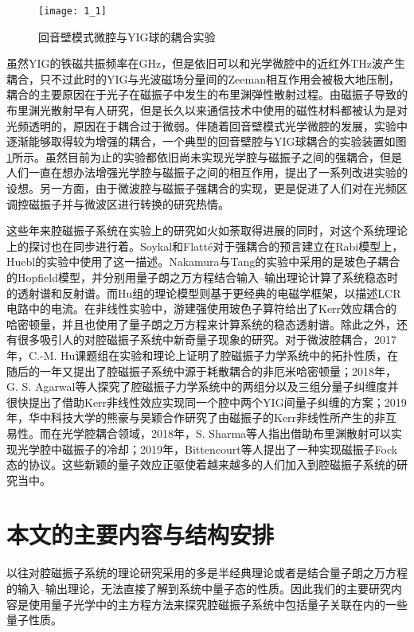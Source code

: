 \begin{figure}[htbp]
	\centering
	\texttt{[image: 1\_1]}
	\caption{回音壁模式微腔与YIG球的耦合实验\cite{PhysRevLett.116.223601Nakamura}} 
	\label{FigOpticalCavity}
\end{figure}
虽然YIG的铁磁共振频率在GHz，但是依旧可以和光学微腔中的近红外THz波产生耦合，只不过此时的YIG与光波磁场分量间的Zeeman相互作用会被极大地压制，耦合的主要原因在于光子在磁振子中发生的布里渊弹性散射过程。由磁振子导致的布里渊光散射早有人研究，但是长久以来通信技术中使用的磁性材料都被认为是对光频透明的，原因在于耦合过于微弱。伴随着回音壁模式光学微腔的发展，实验中逐渐能够取得较为增强的耦合，一个典型的回音壁腔与YIG球耦合的实验装置如图\ref{FigOpticalCavity}所示。虽然目前为止的实验都依旧尚未实现光学腔与磁振子之间的强耦合，但是人们一直在想办法增强光学腔与磁振子之间的相互作用，提出了一系列改进实验的设想\cite{Pantazopoulos_2018,PhysRevB.98.241406Graf,PhysRevResearch.3.013277Graf}。另一方面，由于微波腔与磁振子强耦合的实现，更是促进了人们对在光频区调控磁振子并与微波区进行转换的研究热情。

这些年来腔磁振子系统在实验上的研究如火如荼取得进展的同时，对这个系统理论上的探讨也在同步进行着。Soykal和Flatt\'e对于强耦合的预言建立在Rabi模型上，Huebl的实验中使用了这一描述。Nakamura与Tang的实验中采用的是玻色子耦合的Hopfield模型，并分别用量子朗之万方程结合输入--输出理论计算了系统稳态时的透射谱和反射谱。而Hu组的理论模型则基于更经典的电磁学框架，以描述LCR电路中的电流。在非线性实验中，游建强使用玻色子算符给出了Kerr效应耦合的哈密顿量，并且也使用了量子朗之万方程来计算系统的稳态透射谱。除此之外，还有很多吸引人的对腔磁振子系统中新奇量子现象的研究。对于微波腔耦合，2017年，C.-M. Hu课题组在实验和理论上证明了腔磁振子力学系统中的拓扑性质\cite{PhysRevB.95.214411Hu}，在随后的一年又提出了腔磁振子系统中源于耗散耦合的非厄米哈密顿量\cite{PhysRevLett.121.137203Hu}；2018年，G. S. Agarwal等人探究了腔磁振子力学系统中的两组分以及三组分量子纠缠度并很快提出了借助Kerr非线性效应实现同一个腔中两个YIG间量子纠缠的方案\cite{PhysRevLett.121.203601Agarwal}；2019年，华中科技大学的熊豪与吴颖合作研究了由磁振子的Kerr非线性所产生的非互易性\cite{PhysRevApplied.12.034001Xiong}。而在光学腔耦合领域，2018年，S. Sharma等人指出借助布里渊散射可以实现光学腔中磁振子的冷却\cite{PhysRevLett.121.087205Sharma}；2019年，Bittencourt等人提出了一种实现磁振子Fock态的协议\cite{PhysRevA.100.013810Bittencourt}。这些新颖的量子效应正驱使着越来越多的人们加入到腔磁振子系统的研究当中。

\section{本文的主要内容与结构安排}
以往对腔磁振子系统的理论研究采用的多是半经典理论或者是结合量子朗之万方程的输入--输出理论，无法直接了解到系统中量子态的性质。因此我们的主要研究内容是使用量子光学中的主方程方法来探究腔磁振子系统中包括量子关联在内的一些量子性质。

